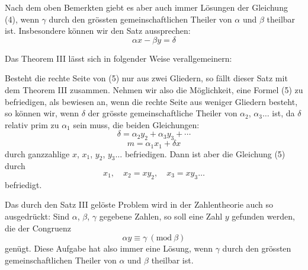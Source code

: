 Nach dem oben Bemerkten giebt es aber auch immer Lösungen der Gleichung (4), wenn $\gamma$ durch den grössten gemeinschaftlichen Theiler von $\alpha$ und $\beta$ theilbar ist. Insbesondere können wir den Satz aussprechen: 
\[
\alpha x - \beta y = \delta
\]

Das Theorem III lässt sich in folgender Weise verallgemeinern:



Besteht die rechte Seite von (5) nur aus zwei Gliedern, so fällt dieser Satz mit dem Theorem III zusammen. Nehmen wir also die Möglichkeit, eine Formel (5) zu befriedigen, als bewiesen an, wenn die rechte Seite aus weniger Gliedern besteht, so können wir, wenn $\delta$ der grösste gemeinschaftliche Theiler von $\alpha_2$, $\alpha_3 \ldots$ ist, da $\delta$ relativ prim zu $\alpha_1$ sein muss, die beiden Gleichungen:
\[
\delta = \alpha_2 y_2 + \alpha_3 y_3 + \cdots
\]
\[
m = \alpha_1 x_1 + \delta x
\]
durch ganzzahlige $x$, $x_1$, $y_2$, $y_3 \ldots$ befriedigen. Dann ist aber die Gleichung (5) durch
\[
x_1, \quad x_2 = x y_2, \quad x_3 = x y_3 \ldots
\]
befriedigt.

Das durch den Satz III gelöste Problem wird in der Zahlentheorie auch so ausgedrückt: Sind $\alpha$, $\beta$, $\gamma$ gegebene Zahlen, so soll eine Zahl $y$ gefunden werden, die der Congruenz
\[
\alpha y \equiv \gamma \ (\mathrm{mod}\ \beta)
\]
genügt. Diese Aufgabe hat also immer eine Lösung, wenn $\gamma$ durch den grössten gemeinschaftlichen Theiler von $\alpha$ und $\beta$ theilbar ist.
